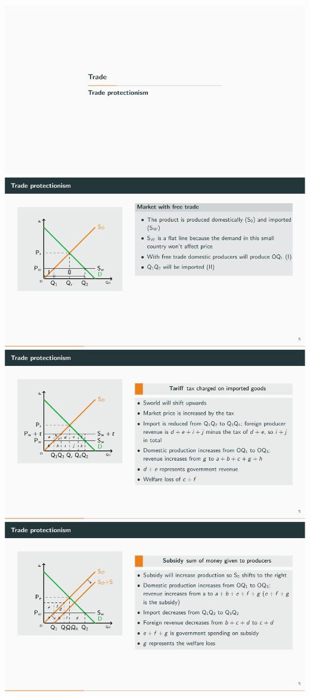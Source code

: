     \begin{center}
        \includegraphics[width=0.81\linewidth]{./Beamer/Page1.pdf}\\
        \vfill
        \includegraphics[width=0.81\linewidth]{./Beamer/Page2.pdf}\\
        \vfill
        \includegraphics[width=0.81\linewidth]{./Beamer/Page3.pdf}\\
        \vfill
        \includegraphics[width=0.81\linewidth]{./Beamer/Page4.pdf}
    \end{center}
